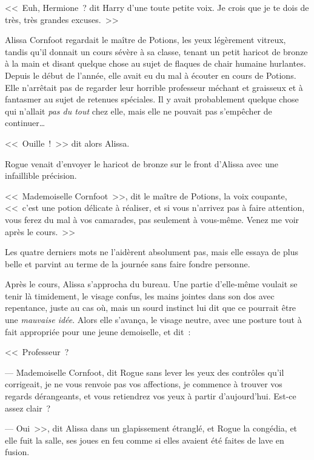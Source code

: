 
<<~Euh, Hermione~? dit Harry d'une toute petite voix. Je crois que je te dois de très, très grandes excuses.~>>


Alissa Cornfoot regardait le maître de Potions, les yeux légèrement vitreux, tandis qu'il donnait un cours sévère à sa classe, tenant un petit haricot de bronze à la main et disant quelque chose au sujet de flaques de chair humaine hurlantes. Depuis le début de l'année, elle avait eu du mal à écouter en cours de Potions. Elle n'arrêtait pas de regarder leur horrible professeur méchant et graisseux et à fantasmer au sujet de retenues spéciales. Il y avait probablement quelque chose qui n'allait \emph{pas du tout} chez elle, mais elle ne pouvait pas s'empêcher de continuer…

<<~Ouille~!~>> dit alors Alissa.

Rogue venait d'envoyer le haricot de bronze sur le front d'Alissa avec une infaillible précision.

<<~Mademoiselle Cornfoot~>>, dit le maître de Potions, la voix coupante, <<~c'est une potion délicate à réaliser, et si vous n'arrivez pas à faire attention, vous ferez du mal à vos camarades, pas seulement à vous-même. Venez me voir après le cours.~>>

Les quatre derniers mots ne l'aidèrent absolument pas, mais elle essaya de plus belle et parvint au terme de la journée sans faire fondre personne.

Après le cours, Alissa s'approcha du bureau. Une partie d'elle-même voulait se tenir là timidement, le visage confus, les mains jointes dans son dos avec repentance, juste au cas où, mais un sourd instinct lui dit que ce pourrait être une \emph{mauvaise idée}. Alors elle s'avança, le visage neutre, avec une posture tout à fait appropriée pour une jeune demoiselle, et dit~:

<<~Professeur~?

--- Mademoiselle Cornfoot, dit Rogue sans lever les yeux des contrôles qu'il corrigeait, je ne vous renvoie pas vos affections, je commence à trouver vos regards dérangeants, et vous retiendrez vos yeux à partir d'aujourd'hui. Est-ce assez clair~?

--- Oui~>>, dit Alissa dans un glapissement étranglé, et Rogue la congédia, et elle fuit la salle, ses joues en feu comme si elles avaient été faites de lave en fusion.

